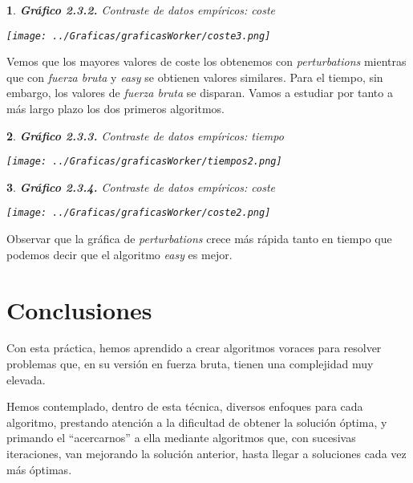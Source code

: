 \documentclass[10pt, a4paper]{article}
\theoremstyle{theorem-style}
\newtheorem*{datos}{}
\theoremstyle{theorem-style}
\theoremstyle{definition-style}
\theoremstyle{remark-style}
\theoremstyle{example-style}
\theoremstyle{definition-style}
\theoremstyle{remark-style}
\begin{document}
\begin{datos}
	{\bf\sffamily Gráfico 2.3.2.} {\sffamily Contraste de datos empíricos: coste}\\
	\vspace{-0.7cm}
	\begin{center}
		\texttt{[image: ../Graficas/graficasWorker/coste3.png]}
	\end{center}	
\end{datos}
Vemos que los mayores valores de coste los obtenemos con \emph{perturbations} mientras que con \emph{fuerza bruta} y \emph{easy} se obtienen valores similares. Para el tiempo, sin embargo, los valores de \emph{fuerza bruta} se disparan. Vamos a estudiar por tanto a más largo plazo los dos primeros algoritmos. 
\begin{datos}
	{\bf\sffamily Gráfico 2.3.3.} {\sffamily Contraste de datos empíricos: tiempo}\\
	\vspace{-0.7cm}
	\begin{center}
		\texttt{[image: ../Graficas/graficasWorker/tiempos2.png]}
	\end{center}	
\end{datos}
\begin{datos}
	{\bf\sffamily Gráfico 2.3.4.} {\sffamily Contraste de datos empíricos: coste}\\
	\vspace{-0.7cm}
	\begin{center}
		\texttt{[image: ../Graficas/graficasWorker/coste2.png]}
	\end{center}	
\end{datos}
Observar que la gráfica de \emph{perturbations} crece más rápida tanto en tiempo que podemos decir que el algoritmo \emph{easy} es mejor.

\pagebreak
\part{Conclusiones}

Con esta práctica, hemos aprendido a crear algoritmos voraces para resolver problemas que, en su versión en fuerza bruta, tienen una complejidad muy elevada.

Hemos contemplado, dentro de esta técnica, diversos enfoques para cada algoritmo, prestando atención a la dificultad de obtener la solución óptima, y primando el ``acercarnos'' a ella mediante algoritmos que, con sucesivas iteraciones, van mejorando la solución anterior, hasta llegar a soluciones cada vez más óptimas.
\end{document}
